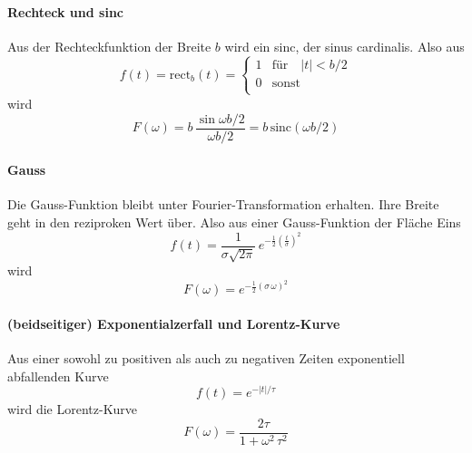 \paragraph{Rechteck und sinc} Aus der Rechteckfunktion der Breite $b$ wird ein sinc, der sinus cardinalis. Also aus
\begin{equation}
 f(t) = \text{rect} _b (t) = \left\{ \begin{array}{ll}
 1 & \text{für} \quad |t| < b/2 \\
 0 & \text{sonst} \\
 \end{array}
 \right.
\end{equation}
wird 
\begin{equation}
F(\omega) = b \,  \frac{\sin \omega b / 2}{\omega b /2} = b \, \text{sinc}( \omega b /2)
\end{equation}



\paragraph{Gauss} Die Gauss-Funktion bleibt unter Fourier-Transformation erhalten. Ihre Breite geht in den reziproken Wert über. Also aus einer Gauss-Funktion der Fläche Eins
\begin{equation}
 f(t) = \frac{1}{\sigma \sqrt{2 \pi}} \, e^{- \frac{1}{2} \left( \frac{t}{\sigma} \right)^2}
\end{equation}
wird
\begin{equation}
 F(\omega) =  e^{- \frac{1}{2} \left( \sigma \, \omega \right) ^2  }
\end{equation}



\paragraph{(beidseitiger) Exponentialzerfall und Lorentz-Kurve} Aus einer sowohl zu positiven als auch zu negativen Zeiten exponentiell abfallenden Kurve 
\begin{equation}
 f(t) = e^{- |t| / \tau}
\end{equation}
wird die Lorentz-Kurve
\begin{equation}
 F(\omega) = \frac{2 \tau}{1 + \omega^2 \, \tau^2}
\end{equation}


